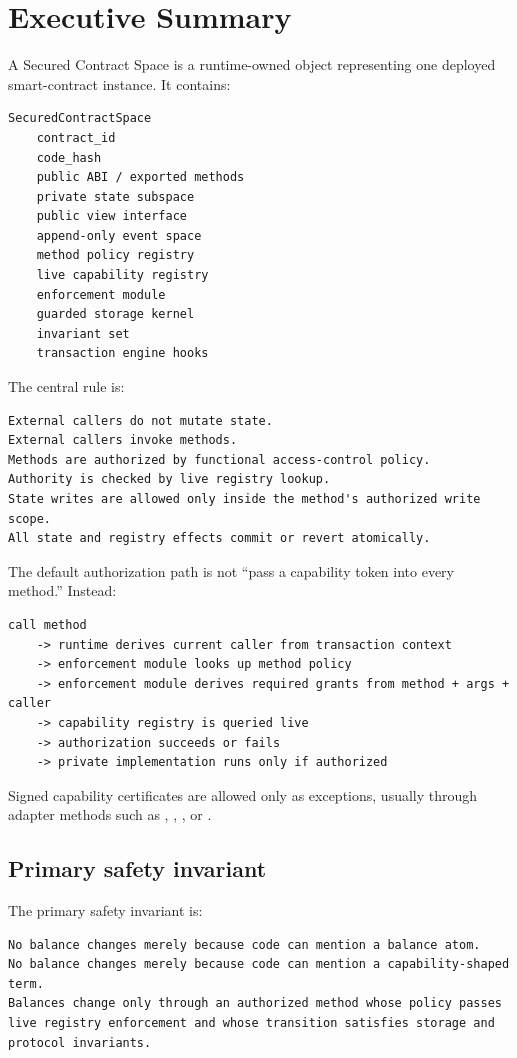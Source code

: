 \section{Executive Summary}

A Secured Contract Space is a runtime-owned object representing one deployed smart-contract instance. It contains:

\begin{lstlisting}
SecuredContractSpace
    contract_id
    code_hash
    public ABI / exported methods
    private state subspace
    public view interface
    append-only event space
    method policy registry
    live capability registry
    enforcement module
    guarded storage kernel
    invariant set
    transaction engine hooks
\end{lstlisting}

The central rule is:

\begin{lstlisting}
External callers do not mutate state.
External callers invoke methods.
Methods are authorized by functional access-control policy.
Authority is checked by live registry lookup.
State writes are allowed only inside the method's authorized write scope.
All state and registry effects commit or revert atomically.
\end{lstlisting}

The default authorization path is not ``pass a capability token into every method.'' Instead:

\begin{lstlisting}
call method
    -> runtime derives current caller from transaction context
    -> enforcement module looks up method policy
    -> enforcement module derives required grants from method + args + caller
    -> capability registry is queried live
    -> authorization succeeds or fails
    -> private implementation runs only if authorized
\end{lstlisting}

Signed capability certificates are allowed only as exceptions, usually through adapter methods such as , , , or .

\subsection{Primary safety invariant}

The primary safety invariant is:

\begin{lstlisting}
No balance changes merely because code can mention a balance atom.
No balance changes merely because code can mention a capability-shaped term.
Balances change only through an authorized method whose policy passes live registry enforcement and whose transition satisfies storage and protocol invariants.
\end{lstlisting}
